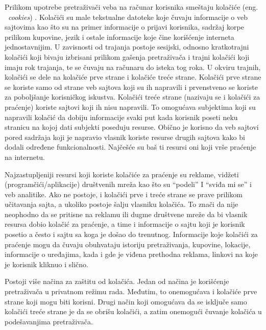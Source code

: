\documentclass[a4paper]{article}
\begin{document}
Prilikom upotrebe pretraživači veba na računar korisnika smeštaju kolačiće (eng. ~{\em cookies}) \cite{cookies1}. Kolačići su male tekstualne datoteke koje čuvaju informacije o veb sajtovima kao što su na primer informacije o prijavi korisnika, sadržaj korpe prilikom  kupovine, jezik i ostale informacije koje čine korišćenje interneta jednostavnijim. U zavisnosti od trajanja postoje sesijski, odnosno kratkotrajni kolačići koji bivaju izbrisani prilikom gašenja pretraživača i trajni kolačići koji imaju rok trajanja, te se čuvaju na računaru do isteka tog roka. U okviru trajnih, kolačići se dele na kolačiće prve strane i kolačiće treće strane.  Kolačići prve strane se koriste samo od strane veb sajtova koji su ih napravili i prvenstveno se koriste za poboljšanje korisničkog iskustva. Kolačići treće strane (nazivaju se i kolačići za praćenje) koriste  sajtovi koji ih nisu napravili. To omogućava subjektima koji su napravili kolačić da dobiju informacije svaki put kada korisnik poseti neku stranicu na kojoj dati subjekti poseduju resurse. Obično je korisno da veb sajtovi pored sadržaja koji je napravio vlasnik koriste resurse drugih sajtova kako bi dodali određene  funkcionalnosti. Najčešće su baš ti resursi oni koji vrše praćenje na internetu.
\par Najzastupljeniji resursi koji koriste kolačiće za praćenje su reklame, vidžeti (programčići/aplikacije) društvenih mreža kao što su “podeli” I “sviđa mi se” i veb analitike. Ako ne postoje, i kolačići prve i treće strane se prave prilikom učitavanja sajta, a ukoliko postoje šalju vlasniku kolačića. To znači da nije neophodno da se pritisne na reklamu ili dugme društvene mreže da bi vlasnik resursa dobio kolačić za praćenje, a time i informacije o sajtu koji je korisnik posetio a često i sajtu sa koga je došao do trenutnog. Informacije koje kolačići za praćenje mogu da čuvaju obuhvataju istoriju pretraživanja, kupovine, lokacije, informacije o uređajima, kada i gde je viđena prethodna reklama, linkovi na koje je korisnik kliknuo i slično. 
\par Postoji više načina za zaštitu od kolačića. Jedan od načina je korišćenje pretraživača u privatnom režimu rada. Međutim, to onemogućava i kolačiće prve strane koji mogu biti korisni. Drugi način koji omogućava da se isključe samo kolačići treće strane je da se obrišu kolačići, a zatim onemogući čuvanje kolačića u podešavanjima pretraživača. 
\end{document}
